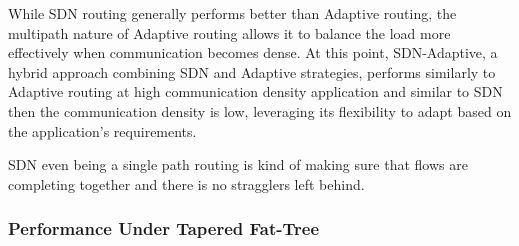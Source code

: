 While SDN routing generally performs better than Adaptive routing, the multipath nature of Adaptive routing allows it to balance the load more effectively when communication becomes dense. At this point, SDN-Adaptive, a hybrid approach combining SDN and Adaptive strategies, performs similarly to Adaptive routing at high communication density application and similar to SDN then the communication density is low, leveraging its flexibility to adapt based on the application's requirements.

SDN even being a single path routing is kind of making sure that flows are completing together and there is no stragglers left behind. 


\subsubsection{Performance Under Tapered Fat-Tree}



